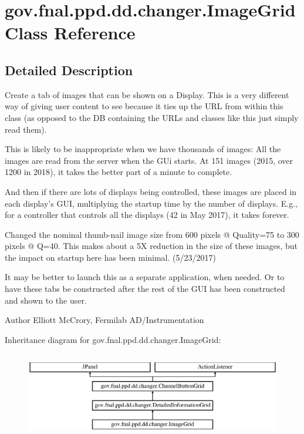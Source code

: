 \hypertarget{classgov_1_1fnal_1_1ppd_1_1dd_1_1changer_1_1ImageGrid}{\section{gov.\-fnal.\-ppd.\-dd.\-changer.\-Image\-Grid Class Reference}
\label{classgov_1_1fnal_1_1ppd_1_1dd_1_1changer_1_1ImageGrid}
}


\subsection{Detailed Description}
Create a tab of images that can be shown on a Display. This is a very different way of giving user content to see because it ties up the U\-R\-L from within this class (as opposed to the D\-B containing the U\-R\-Ls and classes like this just simply read them).

This is likely to be inappropriate when we have thousands of images\-: All the images are read from the server when the G\-Ui starts. At 151 images (2015, over 1200 in 2018), it takes the better part of a minute to complete.

And then if there are lots of displays being controlled, these images are placed in each display's G\-U\-I, multiplying the startup time by the number of displays. E.\-g., for a controller that controls all the displays (42 in May 2017), it takes forever.

Changed the nominal thumb-\/nail image size from 600 pixels @ Quality=75 to 300 pixels @ Q=40. This makes about a 5\-X reduction in the size of these images, but the impact on startup here has been minimal. (5/23/2017)

It may be better to launch this as a separate application, when needed. Or to have these tabs be constructed after the rest of the G\-U\-I has been constructed and shown to the user.

\begin{DoxyAuthor}{Author}
Elliott Mc\-Crory, Fermilab A\-D/\-Instrumentation 
\end{DoxyAuthor}
Inheritance diagram for gov.\-fnal.\-ppd.\-dd.\-changer.\-Image\-Grid\-:\begin{figure}[H]
\begin{center}
\leavevmode
\includegraphics[height=3.783784cm]{classgov_1_1fnal_1_1ppd_1_1dd_1_1changer_1_1ImageGrid}
\end{center}
\end{figure}
